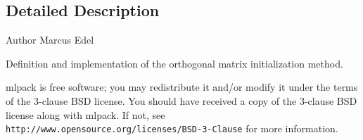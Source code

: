 \subsection{Detailed Description}
\begin{DoxyAuthor}{Author}
Marcus Edel
\end{DoxyAuthor}
Definition and implementation of the orthogonal matrix initialization method.

mlpack is free software; you may redistribute it and/or modify it under the terms of the 3-\/clause B\+SD license. You should have received a copy of the 3-\/clause B\+SD license along with mlpack. If not, see {\tt http\+://www.\+opensource.\+org/licenses/\+B\+S\+D-\/3-\/\+Clause} for more information. 